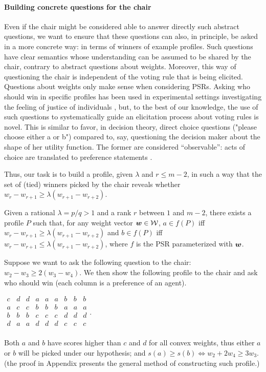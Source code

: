 \documentclass[runningheads]{llncs}
\begin{document}
\paragraph{Building concrete questions for the chair}
Even if the chair might be considered able to answer directly such abstract questions, we want to ensure that these questions can also, in principle, be asked in a more concrete way: in terms of winners of example profiles. Such questions have clear semantics whose understanding can be assumed to be shared by the chair, contrary to abstract questions about weights. 
Moreover, this way of questioning the chair is independent of the voting rule that is being elicited. Questions about weights only make sense when considering PSRs.
Asking who should win in specific profiles has been used in experimental settings investigating the feeling of justice of individuals \cite{Giritligil2005}, but, to the best of our knowledge, the use of such questions to systematically guide an elicitation process about voting rules is novel. 
This is similar to favor, in decision theory, direct choice questions ("please choose either a or b") compared to, say, questioning the decision maker about the shape of her utility function. The former are considered “observable”: acts of choice are translated to preference statements \cite[Ch.\ 1]{colell_microeconomic_1995}. 

Thus, our task is to build a profile, given $\lambda$ and $r ≤ m-2$, in such a way that the set of (tied) winners picked by the chair reveals whether $w_{r} - w_{r+1} \geq \lambda (w_{r+1} - w_{r+2})$.
\begin{proposition}\label{prop:chairQuestions}
	Given a rational $\lambda = p/q > 1$ and a rank $r$ between $1$ and $m - 2$, there exists a profile $P$ such that, for any weight vector $\bm{w} \in \mathcal{W}$, $a \in f(P)$ iff $w_{r} - w_{r+1} ≥ \lambda (w_{r+1} - w_{r+2})$ and $b \in f(P)$ iff $w_{r} - w_{r+1} ≤ \lambda (w_{r+1} - w_{r+2})$, where $f$ is the PSR parameterized with $\bm{w}$.
\end{proposition}

\begin{example}
	Suppose we want to ask the following question to the chair: $w_{2} - w_{3} ≥ 2 (w_{3} - w_{4})$. 
	We then show the following profile to the chair and ask who should win (each column is a preference of an agent).
	\begin{center}
		$
		\begin{array}{ccccccccc}
			c&d&d&a&a&a&b&b&b\\
			a&c&c&b&b&b&a&a&a\\
			b&b&b&c&c&c&d&d&d\\
			d&a&a&d&d&d&c&c&c\\
		\end{array}.
		$
	\end{center}
	Both $a$ and $b$ have scores higher than $c$ and $d$ for all convex weights, thus either $a$ or $b$ will be picked under our hypothesis; and $s(a) ≥ s(b) ⇔ w_2 + 2 w_4 ≥ 3 w_3$.
	(the proof in Appendix presents the general method of constructing such profile.)
\end{example}
\end{document}
